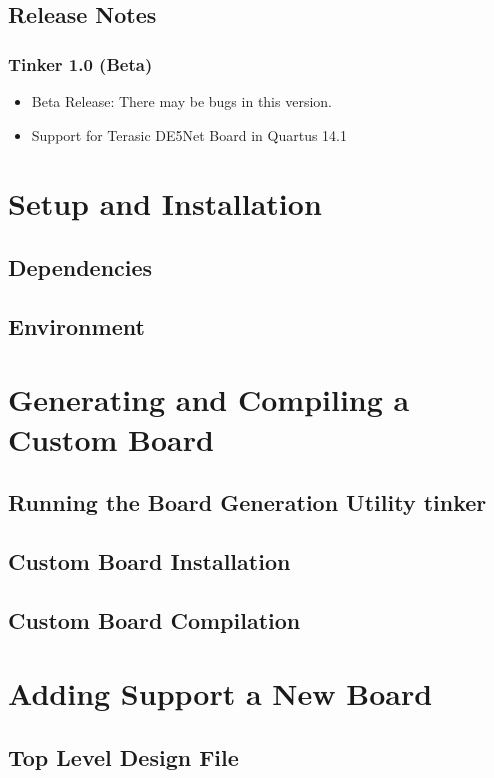 \documentclass{refrep}
\begin{document}
\section{Release Notes}
\subsection{Tinker 1.0 (Beta)}
\begin{itemize}
  \item Beta Release: There may be bugs in this version. 
  \item Support for Terasic DE5Net Board in Quartus 14.1
\end{itemize}
\pagebreak
\chapter{Setup and Installation}
\label{Chapter:Setup}
\section{Dependencies}
\section{Environment}
\pagebreak
\chapter{Generating and Compiling a Custom Board}
\label{Chapter:Generating}
\section{Running the Board Generation Utility tinker}
\label{Chapter:Generating:Sec:Tinker}
\section{Custom Board Installation}
\label{Chapter:Generating:Sec:Installation}
\section{Custom Board Compilation}
\label{Chapter:Generating:Sec:Compilation}
\pagebreak
\chapter{Adding Support a New Board}
\label{Chapter:Adding}
\section{Top Level Design File}
\label{Chapter:Adding:Section:Top}
\end{document}
